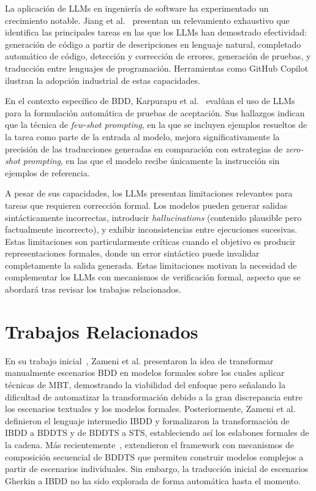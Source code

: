 La aplicación de LLMs en ingeniería de software ha experimentado un crecimiento notable. Jiang et al.~\cite{jiang2024codellm} presentan un relevamiento exhaustivo que identifica las principales tareas en las que los LLMs han demostrado efectividad: generación de código a partir de descripciones en lenguaje natural, completado automático de código, detección y corrección de errores, generación de pruebas, y traducción entre lenguajes de programación. Herramientas como GitHub Copilot ilustran la adopción industrial de estas capacidades.

En el contexto específico de BDD, Karpurapu et al.~\cite{karpurapu2024llm} evalúan el uso de LLMs para la formulación automática de pruebas de aceptación. Sus hallazgos indican que la técnica de \textit{few-shot prompting}, en la que se incluyen ejemplos resueltos de la tarea como parte de la entrada al modelo, mejora significativamente la precisión de las traducciones generadas en comparación con estrategias de \textit{zero-shot prompting}, en las que el modelo recibe únicamente la instrucción sin ejemplos de referencia.

A pesar de sus capacidades, los LLMs presentan limitaciones relevantes para tareas que requieren corrección formal. Los modelos pueden generar salidas sintácticamente incorrectas, introducir \textit{hallucinations} (contenido plausible pero factualmente incorrecto), y exhibir inconsistencias entre ejecuciones sucesivas. Estas limitaciones son particularmente críticas cuando el objetivo es producir representaciones formales, donde un error sintáctico puede invalidar completamente la salida generada. Estas limitaciones motivan la necesidad de complementar los LLMs con mecanismos de verificación formal, aspecto que se abordará tras revisar los trabajos relacionados.

\section{Trabajos Relacionados}
\label{sec:trabajos-relacionados}

En su trabajo inicial~\cite{zameni2023bddts}, Zameni et al. presentaron la idea de transformar manualmente escenarios BDD en modelos formales sobre los cuales aplicar técnicas de MBT, demostrando la viabilidad del enfoque pero señalando la dificultad de automatizar la transformación debido a la gran discrepancia entre los escenarios textuales y los modelos formales. Posteriormente, Zameni et al.~\cite{zameni2024ibdd} definieron el lenguaje intermedio IBDD y formalizaron la transformación de IBDD a BDDTS y de BDDTS a STS, estableciendo así los eslabones formales de la cadena. Más recientemente~\cite{zameni2025composition}, extendieron el framework con mecanismos de composición secuencial de BDDTS que permiten construir modelos complejos a partir de escenarios individuales. Sin embargo, la traducción inicial de escenarios Gherkin a IBDD no ha sido explorada de forma automática hasta el momento.

